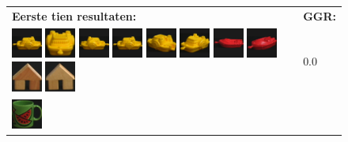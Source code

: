 \begin{figure}[tbp]
\begin{center}
\begin{tabular}{m{11cm} | m{3cm} |}
\textbf{Eerste tien resultaten:} & \textbf{GGR:} \\
\vspace{4pt}
\includegraphics[width=1cm]{coil/beeld-12.eps}
\includegraphics[width=1cm]{coil/beeld-14.eps}
\includegraphics[width=1cm]{coil/beeld-13.eps}
\includegraphics[width=1cm]{coil/beeld-12.eps}
\includegraphics[width=1cm]{coil/beeld-16.eps}
\includegraphics[width=1cm]{coil/beeld-15.eps}
\includegraphics[width=1cm]{coil/beeld-18.eps}
\includegraphics[width=1cm]{coil/beeld-21.eps}
\includegraphics[width=1cm]{coil/beeld-43.eps}
\includegraphics[width=1cm]{coil/beeld-42.eps}
& {\scriptsize 0.0}
\\
\includegraphics[width=1cm]{coil/beeld-30.eps}

\end{tabular}
\end{center}
\end{figure}

